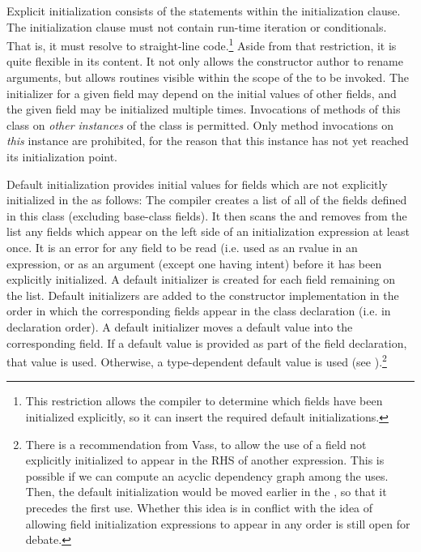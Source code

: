 Explicit initialization consists of the statements within the initialization
clause.  The initialization clause must not contain run-time iteration or
conditionals.  That is, it must resolve to straight-line code.\footnote{This
restriction allows the compiler to determine which fields have been initialized
explicitly, so it can insert the required default initializations.}
Aside from that restriction, it is quite flexible in its content.  It not only allows the constructor
author to rename arguments, but allows routines visible within the scope of
the  to be invoked.  The initializer for a given
field may depend on the initial values of other fields, and the given field may be
initialized multiple times.  Invocations of methods of this
class on \emph{other instances} of the class is permitted.  Only method
invocations on \emph{this} instance are prohibited, for the reason that this
instance has not yet reached its initialization point.

Default initialization provides initial values for fields which are not
explicitly initialized in the  as follows:  The
compiler creates a list of all of the fields defined in this class (excluding
base-class fields).  It then scans the  and removes
from the list any fields which appear on the left side of an initialization
expression at least once.  It is an error for any field to be read (i.e. used as
an rvalue in an expression, or as an argument (except one having  intent)
before it has been explicitly initialized.  
A default initializer is created for each field remaining on the list.  Default
initializers are added to the constructor implementation in the order in which
the corresponding fields appear in the class declaration (i.e. in declaration
order).  A default initializer moves a default value into the corresponding
field.  If a default value is provided as part of the field declaration, that
value is used.  Otherwise, a type-dependent default value is used
(see ).\footnote{There is a recommendation from
Vass, to allow the use of a field not explicitly initialized to appear in the
RHS of another expression.  This is possible if we can compute an acyclic
dependency graph among the uses.  Then, the default initialization would be
moved earlier in the , so that it precedes the first
use.  Whether this idea is in conflict with the idea of allowing field
initialization expressions to appear in any order is still open for debate.}

